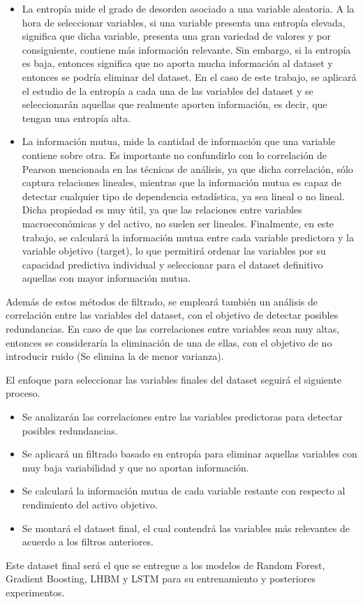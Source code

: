 \begin{itemize}
    \begin{itemize}
        \item La entropía mide el grado de desorden asociado a una variable aleatoria. A la hora de seleccionar variables, si una variable presenta una entropía elevada, significa que dicha variable, presenta una gran variedad de valores y por consiguiente, contiene más información relevante. Sin embargo, si la entropía es baja, entonces significa que no aporta mucha información al dataset y entonces se podría eliminar del dataset. En el caso de este trabajo, se aplicará el estudio de la entropía a cada una de las variables del dataset y se seleccionarán aquellas que realmente aporten información, es decir, que tengan una entropía alta.
        \item La información mutua, mide la cantidad de información que una variable contiene sobre otra. Es importante no confundirlo con lo correlación de Pearson mencionada en las técnicas de análisis, ya que dicha correlación, sólo captura relaciones lineales, mientras que la información mutua es capaz de detectar cualquier tipo de dependencia estadística, ya sea lineal o no lineal. Dicha propiedad es muy útil, ya que las relaciones entre variables macroeconómicas y del activo, no suelen ser lineales. Finalmente, en este trabajo, se calculará la información mutua entre cada variable predictora y la variable objetivo (target), lo que permitirá ordenar las variables por su capacidad predictiva individual y seleccionar para el dataset definitivo aquellas con mayor información mutua.
    \end{itemize}
    Además de estos métodos de filtrado, se empleará también un análisis de correlación entre las variables del dataset, con el objetivo de detectar posibles redundancias. En caso de que las correlaciones entre variables sean muy altas, entonces se consideraría la eliminación de una de ellas, con el objetivo de no introducir ruido (Se elimina la de menor varianza). 

    El enfoque para seleccionar las variables finales del dataset seguirá el siguiente proceso. 
    
    \begin{itemize}
        \item Se analizarán las correlaciones entre las variables predictoras para detectar posibles redundancias. 
        \item Se aplicará un filtrado basado en entropía para eliminar aquellas variables con muy baja variabilidad y que no aportan información. 
        \item Se calculará la información mutua de cada variable restante con respecto al rendimiento del activo objetivo. 
        \item Se montará el dataset final, el cual contendrá las variables más relevantes de acuerdo a los filtros anteriores. 
    \end{itemize}
    Este dataset final será el que se entregue a los modelos de Random Forest, Gradient Boosting, LHBM y LSTM para su entrenamiento y posteriores experimentos.
\end{itemize}


